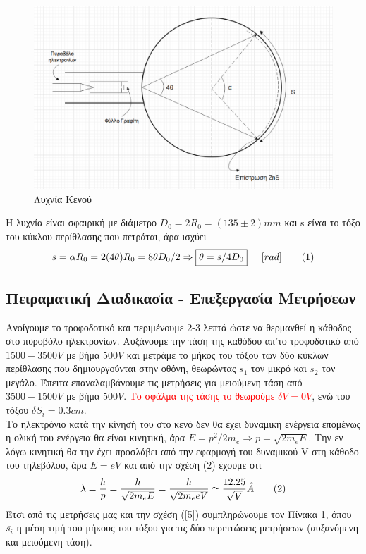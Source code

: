 \documentclass[a4paper]{article}
\newcommand\numberthis{\addtocounter{equation}{1}\tag{\theequation}}
\begin{document}
\begin{figure}[h!]
\centering
\caption{Λυχνία Κενού }
\includegraphics[scale=0.3]{bulb.png}
\end{figure}
Η λυχνία είναι σφαιρική με διάμετρο $D_0=2R_0=(135\pm2)mm$ και s είναι το τόξο του κύκλου περίθλασης που πετράται, άρα ισχύει
\begin{align*}\label{4}
s=\alpha R_0 = 2(4\theta)R_0 = 8\theta D_0/2 \Rightarrow \boxed{\theta =s/4D_0 } \hspace{0.2in} [rad] \numberthis
\end{align*}


\subsection*{Πειραματική Διαδικασία - Επεξεργασία Μετρήσεων}
Ανοίγουμε το τροφοδοτικό και περιμένουμε 2-3 λεπτά ώστε να θερμανθεί η κάθοδος στο πυροβόλο ηλεκτρονίων. Αυξάνουμε την τάση της καθόδου απ'το τροφοδοτικό από $1500-3500V$ με βήμα $500V$ και μετράμε το μήκος του τόξου των δύο κύκλων περίθλασης που δημιουργούνται στην οθόνη, θεωρώντας $s_1$ τον μικρό και $s_2$ τον μεγάλο. Έπειτα επαναλαμβάνουμε τις μετρήσεις για μειούμενη τάση από $3500-1500V$ με βήμα $500V$. \textcolor{red}{Το σφάλμα της τάσης το θεωρούμε $\delta V =0 V$}, ενώ του τόξου $\delta S_i = 0.3cm$.
\\
Το ηλεκτρόνιο κατά την κίνησή του στο κενό δεν θα έχει δυναμική ενέργεια επομένως η ολική του ενέργεια θα είναι κινητική, άρα 
$E=p^2/2m_e\Rightarrow p = \sqrt{2m_eE}$. Την εν λόγω κινητική θα την έχει προσλάβει από την εφαρμογή του δυναμικού V στη κάθοδο του τηλεβόλου, άρα $E=eV$ και από την σχέση (2) έχουμε ότι
\begin{align*}\label{5}
\lambda = \frac{h}{p}  = \frac{h}{\sqrt{2m_eE}} = \frac{h}{\sqrt{2m_e eV}} \simeq \frac{12.25}{\sqrt{V}}\mathring{A} \numberthis
\end{align*}
Έτσι από τις μετρήσεις μας και την σχέση (\ref{5}) συμπληρώνουμε τον Πίνακα 1, όπου $\overline{s_i}$ η μέση τιμή του μήκους του τόξου για τις δύο περιπτώσεις μετρήσεων (αυξανόμενη και μειούμενη τάση). 
\end{document}
